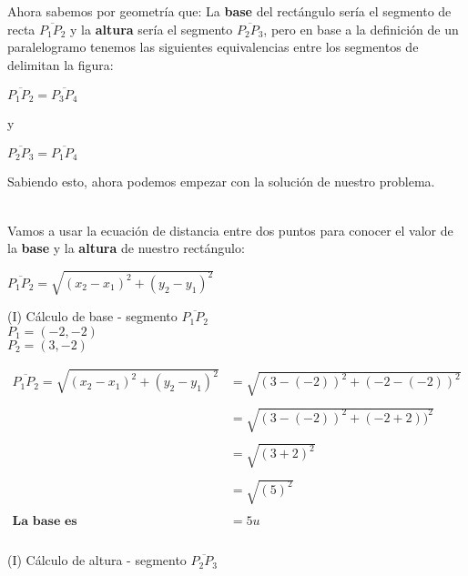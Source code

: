 \documentclass[12pt]{article}
\begin{document}
Ahora sabemos por geometría que: La \textbf{base} del rectángulo sería el segmento de recta $\overline{P_1P_2}$ y la \textbf{altura} sería el segmento $\overline{P_2P_3}$, pero en base a la definición de un paralelogramo tenemos las siguientes equivalencias entre los segmentos de delimitan la figura:
\begin{center}
     $\overline{P_1P_2}=\overline{P_3P_4}$
\end{center}
\begin{center}
     y
\end{center}
\begin{center}
     $\overline{P_2P_3}=\overline{P_1P_4}$
\end{center}
Sabiendo esto, ahora podemos empezar con la solución de nuestro problema.\\
\newpage

{}\\

Vamos a usar la ecuación de distancia entre dos puntos para conocer el valor de la \textbf{base} y la \textbf{altura} de nuestro rectángulo:

\begin{center}
     $\overline{P_1P_2}=\sqrt{(x_2-x_1)^{2}+(y_2-y_1)^2}$
\end{center}

(I) Cálculo de base - segmento $\overline{P_1P_2}$ \\

 $P_1 = (-2,-2)$\\
 
 $P_2 = (3,-2)$

\begin{equation}
    \begin{split}
       \overline{P_1P_2}=\sqrt{(x_2-x_1)^{2}+(y_2-y_1)^2} & =  \sqrt{(3-(-2))^{2}+(-2-(-2))^2} \\\\
         & = \sqrt{(3-(-2))^{2}+(-2+2))^2}\\\\ 
         & = \sqrt{(3+2)^{2}}\\\\ 
        & = \sqrt{(5)^{2}}\\\\ \textbf{La base es} 
         & = 5u \\\\
    \end{split}
\end{equation}

(I) Cálculo de altura - segmento $\overline{P_2P_3}$ \\
\end{document}

